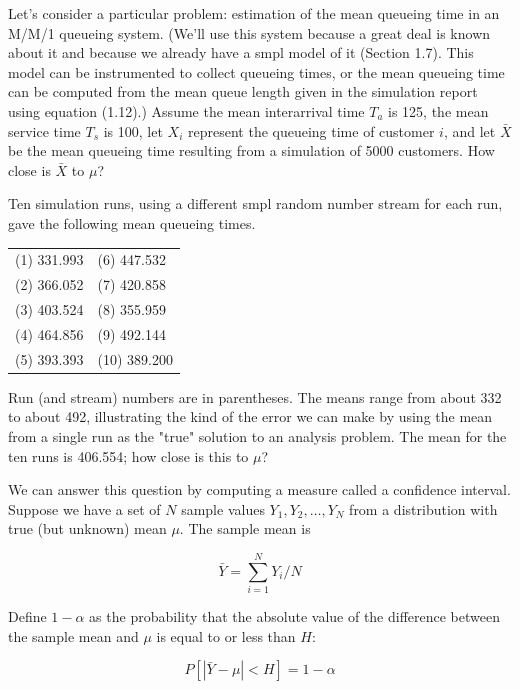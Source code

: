 Let's consider a particular problem: estimation of the mean queueing time in
an M/M/1 queueing system. (We'll use this system because a great deal is known
about it and because we already have a smpl model of it (Section 1.7). This
model can be instrumented to collect queueing times, or the mean queueing time
can be computed from the mean queue length given in the simulation report
using equation (1.12).) Assume the mean interarrival time $T_a$ is 125, the
mean service time $T_s$ is 100, let $X_i$ represent the queueing time of
customer $i$, and let $\bar{X}$ be the mean queueing time resulting from a
simulation of 5000 customers. How close is $\bar{X}$ to $\mu$?

Ten simulation runs, using a different smpl random number stream for each run,
gave the following mean queueing times.

\begin{center}
\begin{tabular}{ll}
(1) 331.993 & (6) 447.532 \\
(2) 366.052 & (7) 420.858 \\
(3) 403.524 & (8) 355.959 \\
(4) 464.856 & (9) 492.144 \\
(5) 393.393 & (10) 389.200 \\
\end{tabular}
\end{center}

\noindent Run (and stream) numbers are in parentheses. The means range from about 332 to
about 492, illustrating the kind of the error we can make by using the mean
from a single run as the "true" solution to an analysis problem. The mean for
the ten runs is 406.554; how close is this to $\mu$?

We can answer this question by computing a measure called a confidence
interval. Suppose we have a set of $N$ sample values $Y_1, Y_2, \ldots, Y_N$
from a distribution with true (but unknown) mean $\mu$. The sample mean is

\begin{equation}
\bar{Y} = \sum_{i=1}^{N} Y_i / N
\label{eq:output-mean-y}
\end{equation}

Define $1 - \alpha$ as the probability that the absolute value of the
difference between the sample mean and $\mu$ is equal to or less than $H$:

\begin{equation}
P[|\bar{Y} - \mu| < H] = 1 - \alpha
\label{eq:output-ci-def}
\end{equation}

